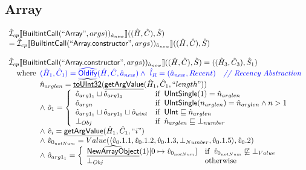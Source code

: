 \documentclass{article}
\newcommand{\SF}[1]{\mbox{\textsf{#1}}}
\newcommand{\comment}[1]{\textit{#1}}
\newcommand{\wherec}[1]{{\rm where}\begin{array}[t]{l}#1\end{array}}
\newcommand{\ifc}[1]{{\rm if}\begin{array}[t]{l}#1\end{array}}
\newcommand{\owc}{{\rm otherwise}}
\newcommand{\aI}{\hat{\mathcal{I}}}
\newcommand{\lbr}{\llbracket}
\newcommand{\rbr}{\rrbracket}
\newcommand{\hf}[1]{\underline{\sf #1}}
\newcommand{\ahf}[1]{\widehat{\underline{\sf #1}}}
\def\inblue{\color{blue}}
\def\inblue{\color{blue}}
\begin{document}
\subsection{Array}
\[
\begin{array}{l}
\aI _{cp}\lbr \SF{BuiltintCall}(``\SF{Array}",args))_{\hat{a}_{new}}\rbr((\hat{H},\hat{C}), \hat{S})\\
  = \aI _{cp}\lbr \SF{BuiltintCall}(``\SF{Array.constructor}",args))_{\hat{a}_{new}}\rbr((\hat{H},\hat{C}), \hat{S})
\\\\

      
      
\aI _{cp}\lbr \SF{BuiltintCall}(``\SF{Array.constructor}",args))_{\hat{a}_{new}}\rbr((\hat{H},\hat{C}), \hat{S})
  = ((\hat{H}_3, \hat{C}_3), \hat{S}_1)\\
\quad\wherec{
  \inblue (\hat{H}_1, \hat{C}_1) = \ahf{Oldify}(\hat{H}, \hat{C}, \hat{a}_{new})
  \land\ \inblue\hat{l}_{R} = (\hat{a}_{new}, Recent)
    \quad\comment{{\inblue // Recency Abstraction}}\\
  \hat{n}_{arglen} = \ahf{toUInt32}(\hf{getArgValue}(\hat{H}_1, \hat{C}_1, ``length"))\\
  \land\ \hat{o}_1 = \left\{\begin{array}{ll}
      \hat{o}_{arg1_1} \sqcup \hat{o}_{arg1_2}
      & \ifc{\SF{UIntSingle}(1) = \hat{n}_{arglen}}\\
      \hat{o}_{argn}
      & \ifc{\SF{UIntSingle}(n_{arglen}) = \hat{n}_{arglen} \land n > 1}\\
      \hat{o}_{arg1_1} \sqcup \hat{o}_{arg1_2} \sqcup \hat{o}_{uint}
      & \ifc{\SF{UInt} \sqsubseteq \hat{n}_{arglen}}\\
      \bot_{Obj} & \ifc{\hat{n}_{arglen} \sqsubseteq \bot_{number}}\\
    \end{array}\right.\\
  \land\ \hat{v}_i = \hf{getArgValue}(\hat{H}_1, \hat{C}_1, ``i")\\
  \land\ \hat{v}_{0_{notNum}} =
    Value(\langle \hat{v}_0.1.1,\hat{v}_0.1.2,\hat{v}_0.1.3,\bot_{Number},\hat{v}_0.1.5 \rangle, \hat{v}_0.2)\\
  \land\ \hat{o}_{arg1_1} = \left\{\begin{array}{ll}
      \ahf{NewArrayObject}(1)[0 \mapsto \hat{v}_{0_{notNum}}] 
      & \ifc{\hat{v}_{0_{notNum}} \not\sqsubseteq \bot_{Value}}\\
      \bot_{Obj} & \owc
    \end{array}\right.\\
}
\end{array}\]
\end{document}
